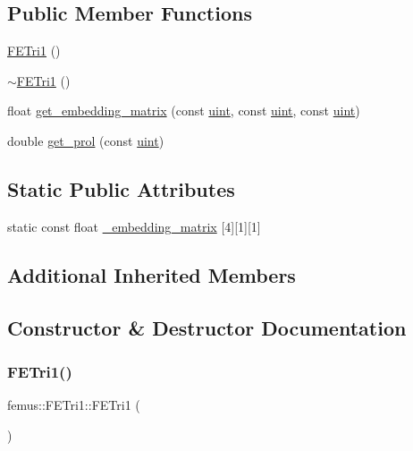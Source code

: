 \subsection*{Public Member Functions}
\begin{DoxyCompactItemize}
\item 
\mbox{\hyperlink{classfemus_1_1_f_e_tri1_a053d378c80f24b0b5e180aac11f0e6a5}{F\+E\+Tri1}} ()
\item 
\mbox{\hyperlink{classfemus_1_1_f_e_tri1_ab002f6876ae1dfdd51a5127c8af66140}{$\sim$\+F\+E\+Tri1}} ()
\item 
float \mbox{\hyperlink{classfemus_1_1_f_e_tri1_a6cbbc2c44efa0f45ae4cfe2c75d8011f}{get\+\_\+embedding\+\_\+matrix}} (const \mbox{\hyperlink{_typedefs_8hpp_a91ad9478d81a7aaf2593e8d9c3d06a14}{uint}}, const \mbox{\hyperlink{_typedefs_8hpp_a91ad9478d81a7aaf2593e8d9c3d06a14}{uint}}, const \mbox{\hyperlink{_typedefs_8hpp_a91ad9478d81a7aaf2593e8d9c3d06a14}{uint}})
\item 
double \mbox{\hyperlink{classfemus_1_1_f_e_tri1_a0884505ef66c9b96487c9faaff0a0c5d}{get\+\_\+prol}} (const \mbox{\hyperlink{_typedefs_8hpp_a91ad9478d81a7aaf2593e8d9c3d06a14}{uint}})
\end{DoxyCompactItemize}
\subsection*{Static Public Attributes}
\begin{DoxyCompactItemize}
\item 
static const float \mbox{\hyperlink{classfemus_1_1_f_e_tri1_af24307019af6d1b13e4585b16325a377}{\+\_\+embedding\+\_\+matrix}} \mbox{[}4\mbox{]}\mbox{[}1\mbox{]}\mbox{[}1\mbox{]}
\end{DoxyCompactItemize}
\subsection*{Additional Inherited Members}


\subsection{Constructor \& Destructor Documentation}
\mbox{\label{classfemus_1_1_f_e_tri1_a053d378c80f24b0b5e180aac11f0e6a5}} 
\subsubsection{\texorpdfstring{F\+E\+Tri1()}{FETri1()}}
{\footnotesize\ttfamily femus\+::\+F\+E\+Tri1\+::\+F\+E\+Tri1 (\begin{DoxyParamCaption}{ }\end{DoxyParamCaption})}

